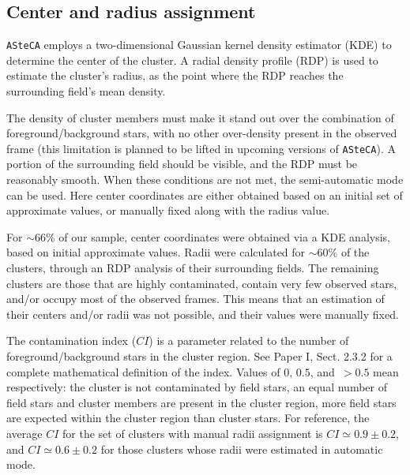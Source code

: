 \documentclass{aa}
\begin{document}

\subsection{Center and radius assignment}
\label{ssec:centre-radius}

\texttt{ASteCA} employs a two-dimensional Gaussian kernel density estimator 
(KDE) to determine the center of the cluster. A radial density profile (RDP) is
used to estimate the cluster's radius, as the point where the RDP reaches the
surrounding field's mean density.

The density of cluster members must make it stand out over the combination of
foreground/background stars, with no other over-density present in the observed
frame (this limitation is planned to be lifted in upcoming versions of
\texttt{ASteCA}). A portion of the surrounding field should be visible, and the
RDP must be reasonably smooth.
%
When these conditions are not met, the semi-automatic mode can be used. Here
center coordinates are either obtained based on an initial set of approximate
values, or manually fixed along with the radius value.

For ${\sim}66\%$ of our sample, center coordinates were obtained via a KDE
analysis, based on initial approximate values. Radii were calculated for
${\sim}60\%$ of the clusters, through an RDP analysis of their surrounding
fields.
%
The remaining clusters are those that are highly contaminated, contain very few
observed stars, and/or occupy most of the observed frames. This means that an
estimation of their centers and/or radii was not possible, and their values
were manually fixed.

The contamination index ($CI$) is a parameter related to the number of
foreground/background stars in the cluster region. See Paper
I, Sect. 2.3.2 for a complete mathematical definition of the index.
Values of $0,\,0.5$, and $\,{>}0.5$ mean respectively: the cluster is not
contaminated by field stars, an equal number of field stars and cluster
members are present in the cluster region, more field stars are
expected within the cluster region than cluster stars.
%
For reference, the average $CI$ for the set of clusters with manual radii
assignment is $CI{\simeq}0.9{\pm}0.2$, and $CI{\simeq}0.6\pm0.2$ for those
clusters whose radii were estimated in automatic mode.
\end{document}
